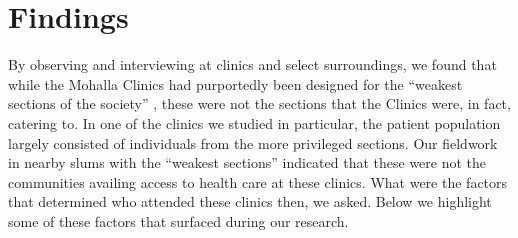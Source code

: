 \section{Findings} %
By observing and interviewing at clinics and select surroundings, we found that while the Mohalla Clinics had purportedly been designed for the ``weakest sections of the society'' \cite{AAPpressrelease}, these were not the sections that the Clinics were, in fact, catering to. In one of the clinics we studied in particular, the patient population largely consisted of individuals from the more privileged sections. Our fieldwork in nearby slums with the ``weakest sections'' indicated that these were not the communities availing access to health care at these clinics. What were the factors that determined who attended these clinics then, we asked. Below we highlight some of these factors that surfaced during our research. 



